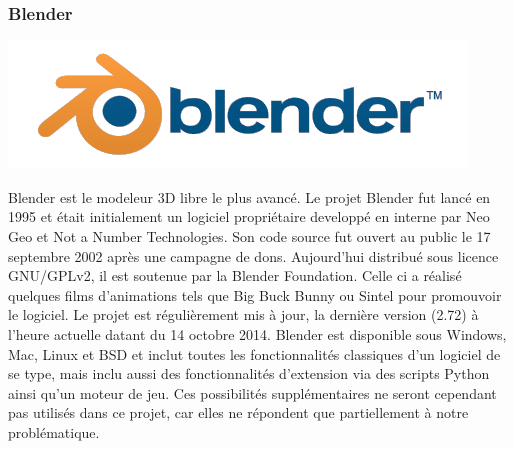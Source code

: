 	\subsubsection{Blender}
		\noindent\begin{minipage}{0.3\textwidth}
			\includegraphics[width=\linewidth]{1-PreEtude/img/blender_logo}
			\end{minipage}
			\hfill
			\begin{minipage}{0.65\textwidth}
			Blender\cite{blender} est le modeleur 3D libre le plus avancé. Le projet Blender fut lancé en 1995 et était initialement un logiciel propriétaire developpé en interne par Neo Geo et Not a Number Technologies.
			Son code source fut ouvert au public le 17 septembre 2002 après une campagne de dons. Aujourd'hui distribué sous licence GNU/GPLv2, il est soutenue par la Blender Foundation. Celle ci a réalisé quelques films d'animations tels que Big Buck Bunny ou Sintel pour promouvoir le logiciel.
			Le projet est régulièrement mis à jour, la dernière version (2.72) à l'heure actuelle datant du 14 octobre 2014.
			Blender est disponible sous Windows, Mac, Linux et BSD et inclut toutes les fonctionnalités classiques d'un logiciel de se type, mais inclu aussi des fonctionnalités d'extension via des scripts Python ainsi qu'un moteur de jeu.
			Ces possibilités supplémentaires ne seront cependant pas utilisés dans ce projet, car elles ne répondent que partiellement à notre problématique.
		\end{minipage}


